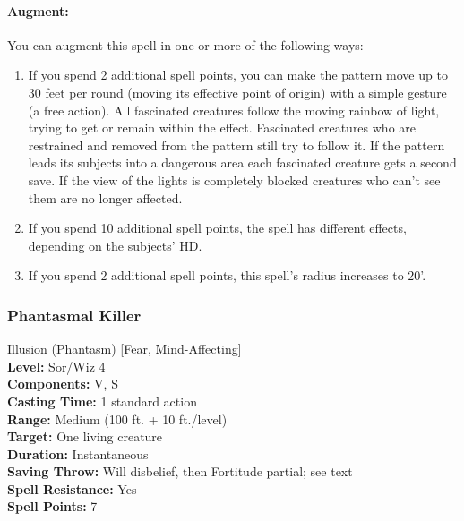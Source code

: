 \paragraph{Augment:} You can augment this spell in one or more of the following ways:
\begin{enumerate}
 \item If you spend 2 additional spell points, you can make the pattern move up to 30 feet per round (moving its effective point of origin) with a simple gesture (a free action). 
All fascinated creatures follow the moving rainbow of light, trying to get or remain within the effect. 
Fascinated creatures who are restrained and removed from the pattern still try to follow it. 
If the pattern leads its subjects into a dangerous area each fascinated creature gets a second save. 
If the view of the lights is completely blocked creatures who can't see them are no longer affected.
 \item If you spend 10 additional spell points, the spell has different effects, depending on the subjects' HD.
 \item If you spend 2 additional spell points, this spell's radius increases to 20'.
\end{enumerate}

\subsubsection{Phantasmal Killer}
\label{Spell:PhantasmalKiller}
Illusion (Phantasm) [Fear, Mind-Affecting]
\\ \textbf{Level:} Sor/Wiz 4
\\ \textbf{Components:} V, S
\\ \textbf{Casting Time:} 1 standard action
\\ \textbf{Range:} Medium (100 ft. + 10 ft./level)
\\ \textbf{Target:} One living creature
\\ \textbf{Duration:} Instantaneous
\\ \textbf{Saving Throw:} Will disbelief, then Fortitude partial; see text
\\ \textbf{Spell Resistance:} Yes
\\ \textbf{Spell Points:} 7

